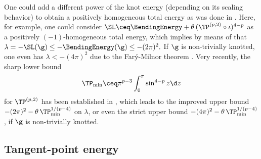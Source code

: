 \begin{remark}
\label{rem:homogeneous-eneriges}
One could add a different power of the knot energy (depending on its scaling
behavior) to obtain a positively homogeneous total energy as was done
in \cite[(1.4)]{gilsbach-etal_2023}. Here, for example, one could consider
$\SL \ceq \BendingEnergy + \theta \, (\TP^{(p,2)}\circ\iota)^{4-p}$ as a positively $(-1)$-homogeneous
total energy, which implies by means of 
that $\lambda=-\SL(\g)\le -\BendingEnergy(\g)\le -(2\pi)^2.$ If
$\g$ is non-trivially knotted, one even has $\lambda< -(4\pi)^2$
due to the Far\'y-Milnor theorem \cite[Corollary 4.6]{milnor_1950}.
Very recently, the sharp lower bound 
\begin{equation}\label{eq:TPmin}
\begin{aligned}
    \TP_\textnormal{min} \ceq 
\pi^{p-3}\int_0^\pi \sin^{4-p}z\d z
\end{aligned}
\end{equation}
for $\TP^{(p,2)}$ has been established
in \cite{doehrer-dohmen_2025}, which leads to the improved upper bound
$-(2\pi)^2 - \theta \, \TP_\textnormal{min}^{1/(p-4)}$ on $\lambda$, or
even the strict upper bound $-(4\pi)^2 - \theta \, \TP_\textnormal{min}^{1/(p-4)}$,
if $\g$ is non-trivially knotted.
\end{remark}
\subsection{Tangent-point energy}\label{sec:RegularityTP}

